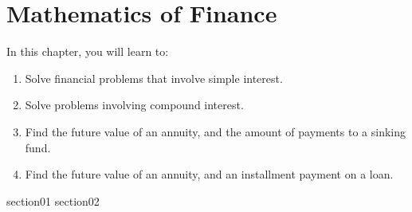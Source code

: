 \chapter{Mathematics of Finance}

In this chapter, you will learn to:
\begin{enumerate}
    \item Solve financial problems that involve simple interest.
    \item Solve problems involving compound interest.
    \item Find the future value of an annuity, and the amount of payments to a sinking fund.
    \item Find the future value of an annuity, and an installment payment on a loan.
\end{enumerate}


{section01}
{section02}
